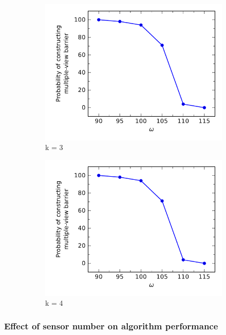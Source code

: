 \begin{figure}[h]
	\begin{subfigure}[t]{.5\textwidth}
		\centering
		\includegraphics[scale=.8]{Hinhanh/OmegaEffect/probability/k3.pdf}		
		\caption{k = 3}
	\end{subfigure}
	\begin{subfigure}[t]{.5\textwidth}
		\centering
		\includegraphics[scale=.8]{Hinhanh/OmegaEffect/probability/k3.pdf}		
		\caption{k = 4}
	\end{subfigure}
\caption{}
\label{fig:}
\end{figure}

\subsubsection{Effect of sensor number on algorithm performance}

